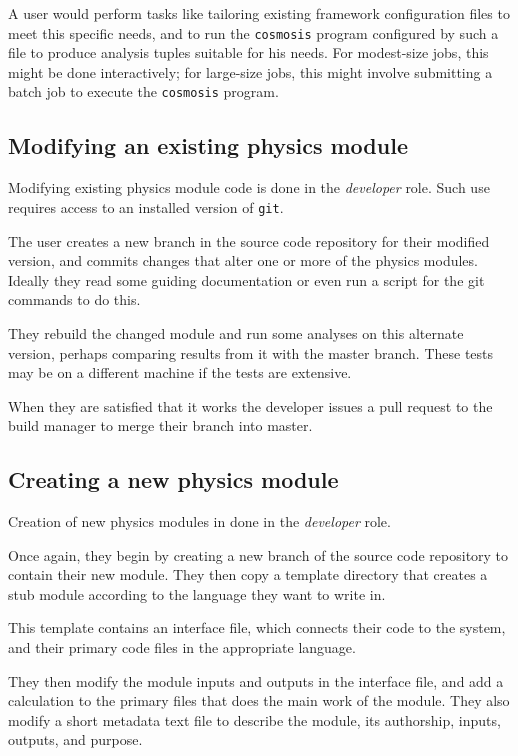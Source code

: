 \documentclass[draftmode,draftwater]{memarticle}
\newcommand{\prog}[1]%
  {\texttt{#1}}
\begin{document}
A user would perform tasks like tailoring existing framework
configuration files to meet this specific needs, and to run the
\prog{cosmosis} program configured by such a file to produce analysis
tuples suitable for his needs. For modest-size jobs, this might be done
interactively; for large-size jobs, this might involve submitting a
batch job to execute the \prog{cosmosis} program.

\subsection{Modifying an existing physics module}

Modifying existing physics module code is done in the
\emph{developer} role. Such use requires access to an
installed version of \prog{git}.

The user creates a new branch in the source code repository
for their modified version, and
commits changes that alter one or more of the physics modules.
Ideally they read some guiding documentation or even run a script
for the git commands to do this.

They rebuild the changed module and run some analyses on this
alternate version, perhaps comparing results from it with the
master branch.  These tests may be on a different machine if the
tests are extensive.

When they are satisfied that it works the developer issues a pull
request to the build manager to merge their branch into master.


\subsection{Creating a new physics module}

Creation of new physics modules in done in the \emph{developer} role.

Once again, they begin by creating a new branch of the source code
repository to contain their new module.  They then copy a template directory
that creates a stub module according to the language they want to write in.

This template contains an interface file, which connects their code to the
system, and their primary code files in the appropriate language.

They then modify the module inputs and outputs in the interface file,
and add a
calculation to the primary files that does the main work of the module.
They also modify a short metadata text file to describe the
module, its authorship, inputs, outputs, and purpose.
\end{document}
